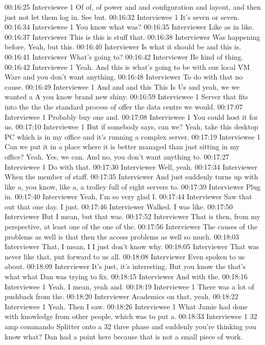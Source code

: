 00:16:25 Interviewee 1
Of of, of power and and configuration and layout, and then just not let them log in. See but.
00:16:32 Interviewee 1
It's seven or seven.
00:16:34 Interviewee 1
You know what was?
00:16:35 Interviewer
Like as in like.
00:16:37 Interviewer
This is this is stuff that.
00:16:38 Interviewer
Was happening before. Yeah, but this.
00:16:40 Interviewer
Is what it should be and this is.
00:16:41 Interviewer
What's going to?
00:16:42 Interviewer
Be kind of thing.
00:16:42 Interviewee 1
Yeah. And this is what's going to be with our local VM Ware and you don't want anything.
00:16:48 Interviewer
To do with that no cause.
00:16:49 Interviewee 1
And and and this This Is Us and yeah, we we wanted a A you know brand new shiny.
00:16:59 Interviewee 1
Server that fits into the the the standard process of offer the data centre we would.
00:17:07 Interviewee 1
Probably buy one and.
00:17:08 Interviewee 1
You could host it for us.
00:17:10 Interviewee 1
But if somebody says, can we? Yeah, take this desktop PC which is in my office and it's running a complex server.
00:17:19 Interviewee 1
Can we put it in a place where it is better managed than just sitting in my office? Yeah. Yes, we can. And no, you don't want anything to.
00:17:27 Interviewee 1
Do with that.
00:17:30 Interviewer
Well, yeah.
00:17:34 Interviewer
When the member of staff.
00:17:35 Interviewer
And just suddenly turns up with like a, you know, like a, a trolley full of eight servers to.
00:17:39 Interviewer
Plug in.
00:17:40 Interviewer
Yeah, I'm so very glad I.
00:17:44 Interviewer
Saw that out that one day. I just.
00:17:46 Interviewer
Walked. I was like.
00:17:50 Interviewer
But I mean, but that was.
00:17:52 Interviewer
That is then, from my perspective, at least one of the one of the.
00:17:56 Interviewer
The causes of the problems as well is that then the access problems as well so much.
00:18:03 Interviewer
That, I mean, I I just don't know why.
00:18:05 Interviewer
That was never like that, put forward to us all.
00:18:08 Interviewer
Even spoken to us about.
00:18:09 Interviewer
It's just, it's interesting. But you know the that's what what Dan was trying to fix.
00:18:15 Interviewer
And with the.
00:18:16 Interviewee 1
Yeah. I mean, yeah and.
00:18:19 Interviewee 1
There was a lot of pushback from the.
00:18:20 Interviewer
Academics on that, yeah.
00:18:22 Interviewee 1
Yeah. Then I saw.
00:18:26 Interviewee 1
What Jamie had done with knowledge from other people, which was to put a.
00:18:33 Interviewee 1
32 amp commando Splitter onto a 32 three phase and suddenly you're thinking you know what? Dan had a point here because that is not a small piece of work.

